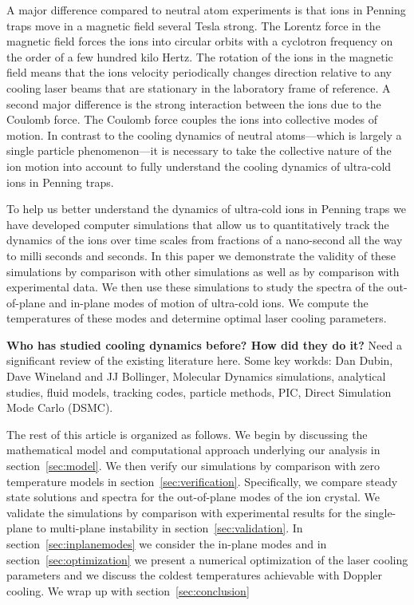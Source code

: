 \documentclass[aps, pra, preprint]{revtex4-1}
\begin{document}
A major difference compared to neutral atom experiments is that
ions in Penning traps move in a magnetic field several Tesla
strong. The Lorentz force in the magnetic field forces the ions
into circular orbits with a cyclotron frequency on the order of a
few hundred kilo Hertz. The rotation of the ions in the magnetic
field means that the ions velocity periodically changes direction
relative to any cooling laser beams that are stationary in the
laboratory frame of reference. A second major difference is the
strong interaction between the ions due to the Coulomb force. The
Coulomb force couples the ions into collective modes of motion.
In contrast to the cooling dynamics of neutral atoms---which is
largely a single particle phenomenon---it is necessary to take
the collective nature of the ion motion into account to fully
understand the cooling dynamics of ultra-cold ions in Penning
traps.

To help us better understand the dynamics of ultra-cold ions in
Penning traps we have developed computer simulations that allow
us to quantitatively track the dynamics of the ions over time
scales from fractions of a nano-second all the way to milli
seconds and seconds. In this paper we demonstrate the validity of
these simulations by comparison with other simulations as well as
by comparison with experimental data. We then use these
simulations to study the spectra of the out-of-plane and in-plane
modes of motion of ultra-cold ions. We compute the temperatures
of these modes and determine optimal laser cooling parameters.

{\bf Who has studied cooling dynamics before? How did they do
it?} Need a significant review of the existing literature here.
Some key workds: Dan Dubin, Dave Wineland and JJ Bollinger,
Molecular Dynamics simulations, analytical studies, fluid models,
tracking codes, particle methods, PIC, Direct Simulation Mode
Carlo (DSMC).

The rest of this article is organized as follows. We begin by
discussing the mathematical model and computational approach
underlying our analysis in section~\ref{sec:model}. We then
verify our simulations by comparison with zero temperature models
in section~\ref{sec:verification}. Specifically, we compare
steady state solutions and  spectra for the out-of-plane modes of the
ion crystal. We validate the simulations by comparison with
experimental results for the single-plane to multi-plane
instability in section~\ref{sec:validation}. In
section~\ref{sec:inplanemodes} we consider the in-plane modes and
in section~\ref{sec:optimization} we present a numerical
optimization of the laser cooling parameters and we discuss the
coldest temperatures achievable with Doppler cooling. We wrap up
with section~\ref{sec:conclusion}
\end{document}
